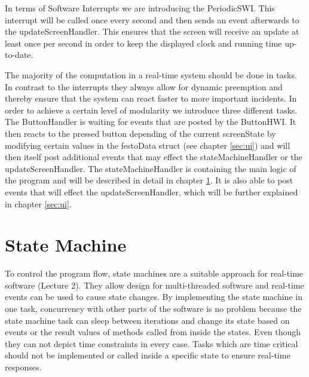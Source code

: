 In terms of Software Interrupts we are introducing the PeriodicSWI.
This interrupt will be called once every second and then sends an event afterwards to the updateScreenHandler.
This ensures that the screen will receive an update at least once per second in order to keep the displayed clock and running time up-to-date.

The majority of the computation in a real-time system should be done in tasks.
In contrast to the interrupts they always allow for dynamic preemption and thereby ensure that the system can react faster to more important incidents.
In order to achieve a certain level of modularity we introduce three different tasks.
The ButtonHandler is waiting for events that are posted by the ButtonHWI.
It then reacts to the pressed button depending of the current screenState by modifying certain values in the festoData struct (see chapter \ref{sec:ui}) and will then itself post additional events that may effect the stateMachineHandler or the updateScreenHandler.
The stateMachineHandler is containing the main logic of the program and will be described in detail in chapter \ref{ch:stateMachine}.
It is also able to post events that will effect the updateScreenHandler, which will be further explained in chapter \ref{sec:ui}.


\section{State Machine} \label{ch:stateMachine}%
To control the program flow, state machines are a suitable approach for real-time software (Lecture 2). They allow design for multi-threaded software and real-time events can be used to cause state changes. By implementing the state machine in one task, concurrency with other parts of the software is no problem because the state machine task can sleep between iterations and change its state based on events or the result values of methods called from inside the states. Even though they can not depict time constraints in every case. Tasks which are time critical should not be implemented or called inside a specific state to ensure real-time responses.


